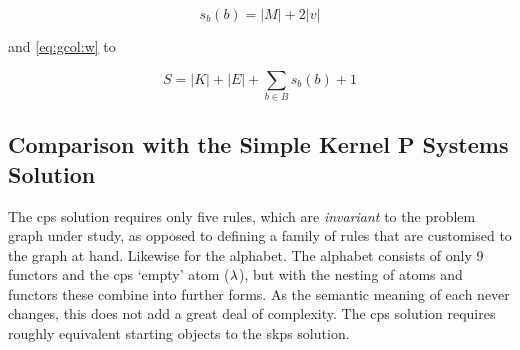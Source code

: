 \begin{equation}
    s_b(b) = |M| + 2 |v|
\end{equation}

and \cref{eq:gcol:w} to

\begin{equation}
    S = |K| + |E| + \sum_{b \in B}s_b(b) + 1
\end{equation}

\subsection{Comparison with the Simple Kernel P Systems Solution}
The \gls{cps} solution requires only five rules, which are \emph{invariant} to the problem graph under study, as opposed to defining a family of rules that are customised to the graph at hand.  Likewise for the alphabet.  The alphabet consists of only 9 functors and the \gls{cps} `empty' atom (\(\lambda\)), but with the nesting of atoms and functors these combine into further forms.  As the semantic meaning of each never changes, this does not add a great deal of complexity.  The \gls{cps} solution requires roughly equivalent starting objects to the \gls{skps} solution.


